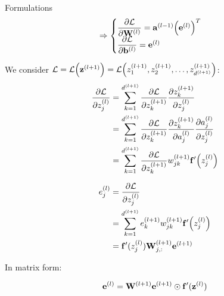 \documentclass[10pt]{beamer}
\theoremstyle{remark}
\theoremstyle{definition}
\begin{document}
\begin{frame}[allowframebreaks]{Formulations}
	\begin{equation}
		\Rightarrow \begin{cases} \dfrac{\partial \mathcal{L}}{\partial \bold{W}^{(l)}}=\bold{a}^{(l-1)}\Big(\bold{e}^{(l)}\Big)^T \\ \dfrac{\partial \mathcal{L}}{\partial \bold{b}^{(l)}}=\bold{e}^{(l)} \end{cases}
	\end{equation}

	We consider $\mathcal{L} = \mathcal{L}\Big(\bold{z}^{(l+1)}\Big)=\mathcal{L}\Big(z_1^{(l+1)}, z_2^{(l+1)}, \dots, z_{d^{(l+1)}}^{(l+1)}\Big)$:
	\begin{equation}
		\begin{aligned}
			\dfrac{\partial \mathcal{L}}{\partial z_j^{(l)}}&=\sum_{k=1}^{d^{(l+1)}}\dfrac{\partial \mathcal{L}}{\partial z_k^{(l+1)}} \dfrac{\partial z_k^{(l+1)}}{\partial z_j^{(l)}}\\&=\sum_{k=1}^{d^{(l+1)}} \dfrac{\partial \mathcal{L}}{\partial z_k^{(l+1)}} \dfrac{\partial z_k^{(l+1)}}{\partial a_j^{(l)}} \dfrac{\partial a_j^{(l)}}{\partial z_j^{(l)}}\\&=\sum_{k=1}^{d^{(l+1)}}\dfrac{\partial \mathcal{L}}{\partial z_k^{(l+1)}}w_{jk}^{(l+1)}\bold{f}^{\prime}\Big(z_j^{(l)}\Big)
		\end{aligned}
	\end{equation}

	\begin{equation}
		\begin{aligned}
			e_j^{(l)}&=\dfrac{\partial \mathcal{L}}{\partial z_j^{(l)}}\\&=\sum_{k=1}^{d^{(l+1)}}e_k^{(l+1)}w_{jk}^{(l+1)}\bold{f}^{\prime}\Big(z_j^{(l)}\Big)\\&=\bold{f}^{\prime}(z_j^{(l)})\bold{W}_{j,:}^{(l+1)}\bold{e}^{(l+1)}
		\end{aligned}
	\end{equation}

	In matrix form:

	\begin{equation}
		\bold{e}^{(l)}=\bold{W}^{(l+1)}\bold{e}^{(l+1)}\odot\bold{f}^{\prime}(\bold{z}^{(l)})
	\end{equation}

	\framebreak


\end{frame}
\end{document}
